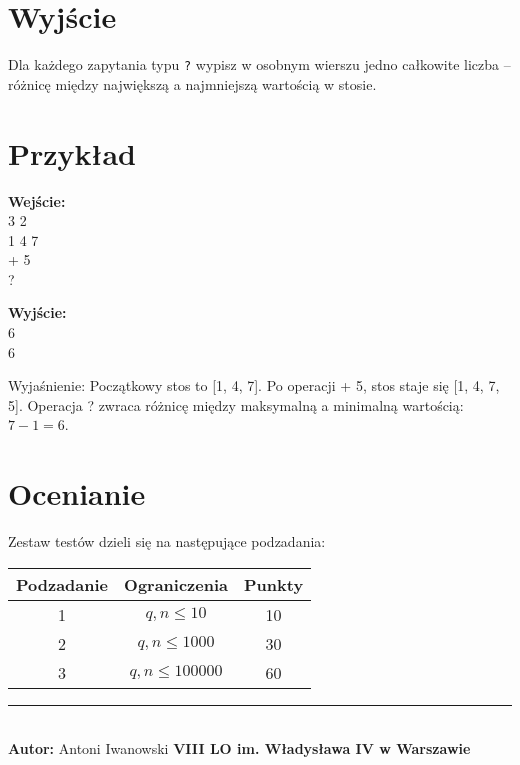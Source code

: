 \documentclass[a4paper,11pt]{article}
\newcommand{\tasktitle}{Świąteczne Prezenty}
\newcommand{\taskshort}{PRE}
\newcommand{\contestinfo}{Konkurs Świąteczny 2024 - Grupa Początkująca.}
\newcommand{\memorylimit}{10 MB}
\newcommand{\exampleinput}{3 2\\1 4 7\\+ 5\\?}
\newcommand{\exampleoutput}{6\\6}
\newcommand{\explanation}{Początkowy stos to [1, 4, 7]. Po operacji + 5, stos staje się [1, 4, 7, 5]. Operacja ? zwraca różnicę między maksymalną a minimalną wartością: $7 - 1 = 6$.}
\newcommand{\subtasktable}{%
\begin{tabular}{|c|c|c|}
\hline
Podzadanie & Ograniczenia & Punkty \\
\hline
1 & $q, n \leq 10$ & 10 \\
2 & $q, n \leq 1000$ & 30 \\
3 & $q, n \leq 100000$ & 60 \\
\hline
\end{tabular}}
\begin{document}
\section*{Wyjście}
Dla każdego zapytania typu \texttt{?} wypisz w osobnym wierszu jedno całkowite liczba – różnicę między największą a najmniejszą wartością w stosie.
\newpage
\section*{Przykład}
\begin{multicols}{2}
\noindent\textbf{Wejście:} \\
\exampleinput

\columnbreak

\noindent\textbf{Wyjście:} \\
\exampleoutput
\end{multicols}

\noindent Wyjaśnienie: \explanation

\section*{Ocenianie}
Zestaw testów dzieli się na następujące podzadania:
\begin{center}
\subtasktable
\end{center}

\vspace*{\fill}
\noindent\rule{\textwidth}{0.4pt} \\
\small \textbf{Autor:} Antoni Iwanowski \hfill \textbf{VIII LO im. Władysława IV w Warszawie}

\end{document}
